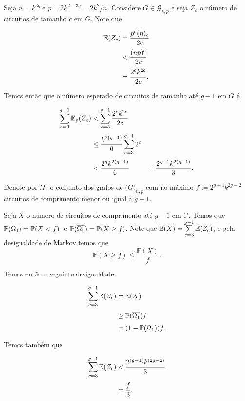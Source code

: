 Seja $n = k^{3g}$ e $p = 2k^{2-3g} = 2k^2/n$. Considere $G \in\mathcal{G}_{n,p}$ e seja $Z_c$ o número de circuitos de tamanho $c$ em $G$. Note que

\begin{equation*}
\setlength{\jot}{6pt}
\begin{aligned}
\bbe(Z_c) &= \frac{p^c(n)_c}{2c} \\
&< \frac{(np)^c}{2c} \\
&= \frac{2^ck^{2c}}{2c}.
\end{aligned}
\end{equation*}

Temos então que o número esperado de circuitos de tamanho até $g-1$ em $G$ é

\begin{equation*}
\setlength{\jot}{6pt}
\begin{aligned}
\sum\limits_{c=3}^{g-1}\bbe_p(Z_c) &< \sum\limits_{c=3}^{g-1}\frac{2^ck^{2c}}{2c} \\
&\leq \frac{k^{2(g-1)}}{6}\sum\limits_{c=3}^{g-1}2^c \\
&< \frac{2^gk^{2(g-1)}}{6} &= \frac{2^{g-1}k^{2(g-1)}}{3}.
\end{aligned}
\end{equation*}

Denote por $\Omega_1$ o conjunto dos grafos de $\mathbb(G)_{n,p}$ com no máximo $f := 2^{g-1}k^{2g-2}$ circuitos de comprimento menor ou igual a $g-1$.

Seja $X$ o número de circuitos de comprimento até $g-1$ em $G$. Temos que $\mathbb{P}(\Omega_1) = \mathbb{P}(X < f)$, e $\mathbb{P}(\overline{\Omega_1}) = \mathbb{P}(X\geq f)$. Note que $\mathbb{E}(X) = \sum\limits_{c=3}^{g-1}\mathbb{E}(Z_c)$, e pela desigualdade de Markov temos que \[\mathbb{P}(X \geq f) \leq \frac{\mathbb{E}(X)}{f}.\]

Temos então a seguinte desigualdade

\begin{equation*}
\setlength{\jot}{6pt}
\begin{aligned}
\sum\limits_{c=3}^{g-1}\bbe(Z_c) &= \bbe(X) \\ 
&\geq \bbp(\overline{\Omega_1})f \\
&= (1 - \bbp(\Omega_1))f.
\end{aligned}
\end{equation*}

Temos também que

\begin{equation*}
\setlength{\jot}{6pt}
\begin{aligned}
\sum\limits_{c=3}^{g-1}\bbe(Z_c) &< \frac{2^{(g-1)}k^{(2g-2)}}{3} \\
&= \frac{f}{3}.
\end{aligned}
\end{equation*}


